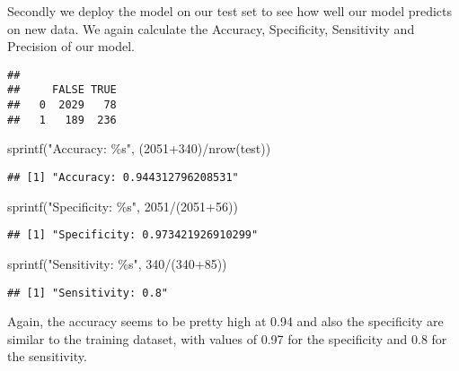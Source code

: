 \documentclass[
]{article}
\newenvironment{Shaded}{\begin{snugshade}}{\end{snugshade}}
\newcommand{\DecValTok}[1]{\textcolor[rgb]{0.00,0.00,0.81}{#1}}
\newcommand{\FunctionTok}[1]{\textcolor[rgb]{0.00,0.00,0.00}{#1}}
\newcommand{\NormalTok}[1]{#1}
\newcommand{\SpecialCharTok}[1]{\textcolor[rgb]{0.00,0.00,0.00}{#1}}
\newcommand{\StringTok}[1]{\textcolor[rgb]{0.31,0.60,0.02}{#1}}
\begin{document}
Secondly we deploy the model on our test set to see how well our model
predicts on new data. We again calculate the Accuracy, Specificity,
Sensitivity and Precision of our model.

\begin{verbatim}
##    
##     FALSE TRUE
##   0  2029   78
##   1   189  236
\end{verbatim}

\begin{Shaded}
\begin{Highlighting}[]
\FunctionTok{sprintf}\NormalTok{(}\StringTok{"Accuracy: \%s"}\NormalTok{, (}\DecValTok{2051}\SpecialCharTok{+}\DecValTok{340}\NormalTok{)}\SpecialCharTok{/}\FunctionTok{nrow}\NormalTok{(test))}
\end{Highlighting}
\end{Shaded}

\begin{verbatim}
## [1] "Accuracy: 0.944312796208531"
\end{verbatim}

\begin{Shaded}
\begin{Highlighting}[]
\FunctionTok{sprintf}\NormalTok{(}\StringTok{"Specificity: \%s"}\NormalTok{, }\DecValTok{2051}\SpecialCharTok{/}\NormalTok{(}\DecValTok{2051}\SpecialCharTok{+}\DecValTok{56}\NormalTok{))}
\end{Highlighting}
\end{Shaded}

\begin{verbatim}
## [1] "Specificity: 0.973421926910299"
\end{verbatim}

\begin{Shaded}
\begin{Highlighting}[]
\FunctionTok{sprintf}\NormalTok{(}\StringTok{"Sensitivity: \%s"}\NormalTok{, }\DecValTok{340}\SpecialCharTok{/}\NormalTok{(}\DecValTok{340}\SpecialCharTok{+}\DecValTok{85}\NormalTok{))}
\end{Highlighting}
\end{Shaded}

\begin{verbatim}
## [1] "Sensitivity: 0.8"
\end{verbatim}

Again, the accuracy seems to be pretty high at 0.94 and also the
specificity are similar to the training dataset, with values of 0.97 for
the specificity and 0.8 for the sensitivity.
\end{document}
